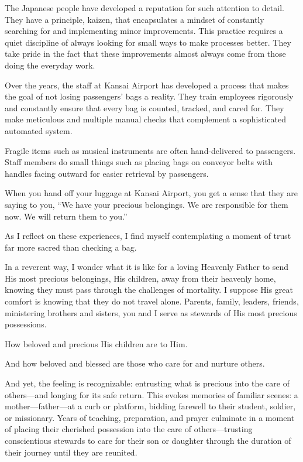 \documentclass[letterpaper, 11pt]{report}
\newcommand{\intalkheader}[1]{
    \vspace{0.75em}
    \noindent{\normalsize\bfseries #1}
    \par\nopagebreak %
    \vspace{0.25em}
    \nopagebreak     %
}
\begin{document}
The Japanese people have developed a reputation for such attention to detail. They have a principle, kaizen, that encapsulates a mindset of constantly searching for and implementing minor improvements. This practice requires a quiet discipline of always looking for small ways to make processes better. They take pride in the fact that these improvements almost always come from those doing the everyday work.

Over the years, the staff at Kansai Airport has developed a process that makes the goal of not losing passengers’ bags a reality. They train employees rigorously and constantly ensure that every bag is counted, tracked, and cared for. They make meticulous and multiple manual checks that complement a sophisticated automated system.

Fragile items such as musical instruments are often hand-delivered to passengers. Staff members do small things such as placing bags on conveyor belts with handles facing outward for easier retrieval by passengers.

When you hand off your luggage at Kansai Airport, you get a sense that they are saying to you, “We have your precious belongings. We are responsible for them now. We will return them to you.”

\intalkheader{Our Heavenly Father’s Love}

As I reflect on these experiences, I find myself contemplating a moment of trust far more sacred than checking a bag.

In a reverent way, I wonder what it is like for a loving Heavenly Father to send His most precious belongings, His children, away from their heavenly home, knowing they must pass through the challenges of mortality. I suppose His great comfort is knowing that they do not travel alone. Parents, family, leaders, friends, ministering brothers and sisters, you and I serve as stewards of His most precious possessions.

How beloved and precious His children are to Him.

And how beloved and blessed are those who care for and nurture others.

And yet, the feeling is recognizable: entrusting what is precious into the care of others—and longing for its safe return. This evokes memories of familiar scenes: a mother—father—at a curb or platform, bidding farewell to their student, soldier, or missionary. Years of teaching, preparation, and prayer culminate in a moment of placing their cherished possession into the care of others—trusting conscientious stewards to care for their son or daughter through the duration of their journey until they are reunited.
\end{document}
